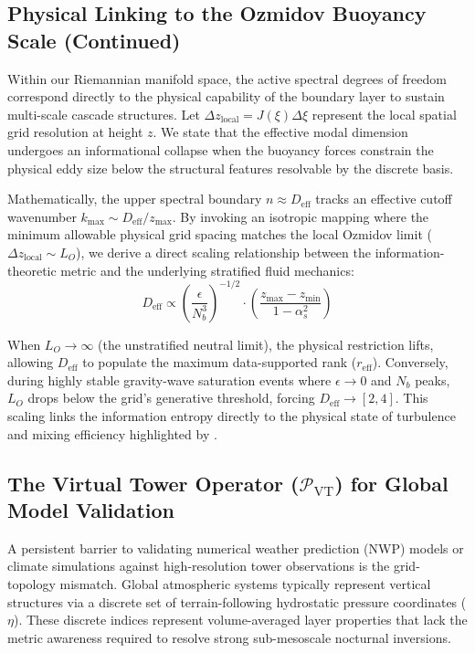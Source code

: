 \subsection{Physical Linking to the Ozmidov Buoyancy Scale (Continued)}
\label{sec:extensions:ozmidov_cont}

Within our Riemannian manifold space, the active spectral degrees of freedom correspond directly to the physical capability of the boundary layer to sustain multi-scale cascade structures. Let $\Delta z_{\text{local}} = J(\xi) \Delta \xi$ represent the local spatial grid resolution at height $z$. We state that the effective modal dimension undergoes an informational collapse when the buoyancy forces constrain the physical eddy size below the structural features resolvable by the discrete basis.

Mathematically, the upper spectral boundary $n \approx D_{\mathrm{eff}}$ tracks an effective cutoff wavenumber $k_{\mathrm{max}} \sim D_{\mathrm{eff}} / z_{\max}$. By invoking an isotropic mapping where the minimum allowable physical grid spacing matches the local Ozmidov limit ($\Delta z_{\text{local}} \sim L_O$), we derive a direct scaling relationship between the information-theoretic metric and the underlying stratified fluid mechanics:
\begin{equation}
D_{\mathrm{eff}} \propto \left( \frac{\epsilon}{N_b^3} \right)^{-1/2} \cdot \left( \frac{z_{\max} - z_{\min}}{1 - \alpha_s^2} \right)
\label{eq:d_eff_ozmidov_scaling}
\end{equation}

When $L_O \rightarrow \infty$ (the unstratified neutral limit), the physical restriction lifts, allowing $D_{\mathrm{eff}}$ to populate the maximum data-supported rank ($r_{\mathrm{eff}}$). Conversely, during highly stable gravity-wave saturation events where $\epsilon \rightarrow 0$ and $N_b$ peaks, $L_O$ drops below the grid's generative threshold, forcing $D_{\mathrm{eff}} \rightarrow [2, 4]$. This scaling links the information entropy directly to the physical state of turbulence and mixing efficiency highlighted by \citet{Garanaik2019}.

\subsection{The Virtual Tower Operator ($\mathcal{P}_{\mathrm{VT}}$) for Global Model Validation}
\label{sec:extensions:virtual_tower}

A persistent barrier to validating numerical weather prediction (NWP) models or climate simulations against high-resolution tower observations is the grid-topology mismatch. Global atmospheric systems typically represent vertical structures via a discrete set of terrain-following hydrostatic pressure coordinates ($\eta$). These discrete indices represent volume-averaged layer properties that lack the metric awareness required to resolve strong sub-mesoscale nocturnal inversions.


